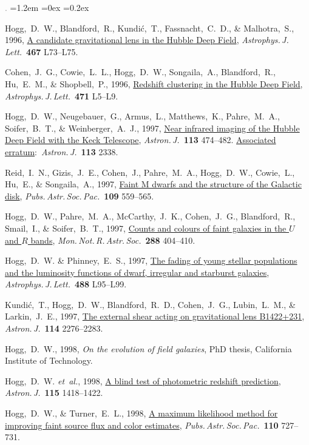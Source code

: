 \documentclass[10pt,letterpaper]{article}
\newcommand{\foreign}[1]{\textsl{#1}}
\newcommand{\etal}{\foreign{et~al.}}
\newcommand{\doi}[2]{\href{http://dx.doi.org/#1}{{#2}}}
\newcommand{\ads}[2]{\href{http://adsabs.harvard.edu/abs/#1}{{#2}}}
\newcommand{\deemph}[1]{\textcolor{grey}{\footnotesize{#1}}}
\newcommand{\pubnumber}[1]{\deemph{{#1}.}}
\newcounter{refpubnum}
\newcommand{\hogglist}{%
    \rightmargin=0in
    \leftmargin=1.2em
    \topsep=0ex
    \partopsep=0pt
    \itemsep=0.2ex
    \parsep=0pt
    \itemindent=-1.0\leftmargin
    \listparindent=0.0\leftmargin
    \settowidth{\labelsep}{~}
    \usecounter{refpubnum}
  }
\begin{document}
\begin{list}{\pubnumber{\therefpubnum}}{\hogglist}
\item
Hogg,~D.~W., Blandford,~R., Kundi\'c,~T., Fassnacht,~C.~D., \& Malhotra,~S., 1996,
\doi{10.1086/310213}{A candidate gravitational lens in the Hubble Deep Field},
\textit{Astrophys.\,J.\,Lett.}\ \textbf{467} L73--L75.
\item
Cohen,~J.~G., Cowie,~L.~L., Hogg,~D.~W., Songaila,~A., Blandford,~R.,
Hu,~E.~M., \& Shopbell,~P., 1996,
\doi{10.1086/310330}{Redshift clustering in the Hubble Deep Field},
\textit{Astrophys.\,J.\,Lett.}\ \textbf{471} L5--L9.
\item
Hogg,~D.~W., Neugebauer,~G., Armus,~L., Matthews,~K., Pahre,~M.~A., Soifer,~B.~T.,
\& Weinberger,~A.~J., 1997,
\doi{10.1086/118269}{Near infrared imaging of the Hubble Deep Field with the Keck Telescope},
\textit{Astron.\,J.}\ \textbf{113} 474--482.
\doi{10.1086/118445}{Associated erratum}:\ \textit{Astron.\,J.}\ \textbf{113} 2338.
\item
Reid,~I.~N., Gizis,~J.~E., Cohen,~J., Pahre,~M.~A., Hogg,~D.~W., Cowie,~L., Hu,~E., \& Songaila,~A., 1997,
\ads{1997PASP..109..559R}{Faint M dwarfs and the structure of the Galactic disk},
\textit{Pubs.\,Astr.\,Soc.\,Pac.}\ \textbf{109} 559--565.
\item
Hogg,~D.~W., Pahre,~M.~A., McCarthy,~J.~K., Cohen,~J.~G., Blandford,~R., Smail,~I., \& Soifer,~B.~T., 1997,
\ads{1997MNRAS.288..404H}{Counts and colours of faint galaxies in the $U$ and $R$ bands},
\textit{Mon.\,Not.\,R.\,Astr.\,Soc.}\ \textbf{288} 404--410.
\item
Hogg,~D.~W. \& Phinney,~E.~S., 1997,
\doi{10.1086/310929}{The fading of young stellar populations and the luminosity functions of dwarf, irregular and starburst galaxies},
\textit{Astrophys.\,J.\,Lett.}\ \textbf{488} L95--L99.
\item
Kundi\'c,~T., Hogg,~D.~W., Blandford,~R.~D., Cohen,~J.~G., Lubin,~L.~M., \& Larkin,~J.~E., 1997,
\doi{10.1086/118647}{The external shear acting on gravitational lens B1422+231},
\textit{Astron.\,J.}\ \textbf{114} 2276--2283.
\item
Hogg,~D.~W., 1998,
{\textit{On the evolution of field galaxies},}
PhD thesis, California Institute of Technology.
\item
Hogg,~D.~W. \etal, 1998,
\doi{10.1086/300277}{A blind test of photometric redshift prediction},
\textit{Astron.\,J.}\ \textbf{115} 1418--1422.
\item
Hogg,~D.~W., \& Turner,~E.~L., 1998,
\ads{1998PASP..110..727H}{A maximum likelihood method for improving faint source flux and color estimates},
\textit{Pubs.\,Astr.\,Soc.\,Pac.}\ \textbf{110} 727--731.

\end{list}
\end{document}
